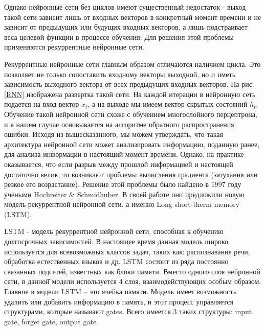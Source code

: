     Однако нейронные сети без циклов имеют существенный недостаток - выход такой сети зависит лишь от входных векторов в конкретный момент времени и не зависит от предыдущих или будущих входных векторов, а лишь подстраивает веса целевой функции в процессе обучения. Для решения этой проблемы применяются рекуррентные нейронные сети.

    Рекуррентные нейронные сети главным образом отличаются наличием цикла. Это позволяет не только сопоставить входному векторы выходной, но и иметь зависимость выходного вектора от всех предыдущих входных векторов. На рис. \ref{RNN} изображена развертка такой сети. На каждой итерации в нейронную сеть подается на вход вектор $x_{t}$, а на выходе мы имеем вектор скрытых состояний $h_{t}$.
    Обучение такой нейронной сети схоже с обучением многослойного перцептрона, и в нашем случае основывается на алгоритме обратного распространения ошибки. Исходя из вышесказанного, мы можем утверждать, что такая архитектура нейронной сети может анализировать информацию, поданную ранее, для анализа информации в настоящий момент времени. Однако, на практике оказывается, что если разрыв между прошлой информацией и настоящей достаточно велик, то возникают проблемы вычисления градиента (затухания или резкое его возрастание). Решение этой проблемы было найдено в 1997 году учеными Hochreiter \& Schmidhuber. В своей работе они предложили новую модель рекуррентной нейронной сети, а именно Long short-therm memory (LSTM).

    LSTM - модель рекуррентной нейронной сети, способная к обучению долгосрочных зависимостей. В настоящее время данная модель широко используется для всевозможных классов задач, таких как: распознавание речи, обработка естественных языков и др. LSTM состоит из ряда постоянно связанных подсетей, известных как блоки памяти. Вместо одного слоя нейронной сети, в данной̆ модели используется 4 слоя, взаимодействующих особым образом. Главное в модели LSTM – это ячейка памяти. Модель имеет возможность удалить или добавить информацию в память, и этот процесс управляется структурами, которые называют gates. Всего имеется 3 таких структуры: input gate, forget gate, output gate.
    

